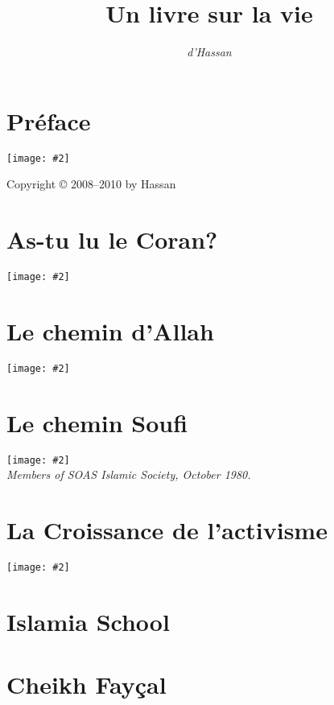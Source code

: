 \documentclass[12pt]{memoir}
\title{Un livre sur la vie}
\author{\emph{d’Hassan}}
\newcommand{\img}[3]{\begin{center}%
\texttt{[image: \#2]}\\{\small\em#3}%
\end{center}}
\begin{document}
\frontmatter

\maketitle
\thispagestyle{empty}
\cleardoublepage

\setcounter{page}{1}
\tableofcontents

\chapter{Préface}

\img{scale=0.1}{Tunis_Hassan.jpg}{}


\hfill Copyright © 2008–2010 by Hassan

\mainmatter


\chapter{As-tu lu le Coran?}

\img{scale=0.7}{Baby_Hassan.jpg}{}


\chapter{Le chemin d’Allah}

\img{scale=1}{Hassan_1980.jpg}{}


\chapter{Le chemin Soufi}

\img{scale=0.7}{Members_SOAS_Islamic_Society.jpg}
{Members of SOAS Islamic Society, October 1980.}


\chapter{La Croissance de l’activisme}

\img{scale=0.7}{Assassination_of_Sadat.jpg}{}


\chapter{Islamia School}


\chapter{Cheikh Fayçal}
\end{document}
